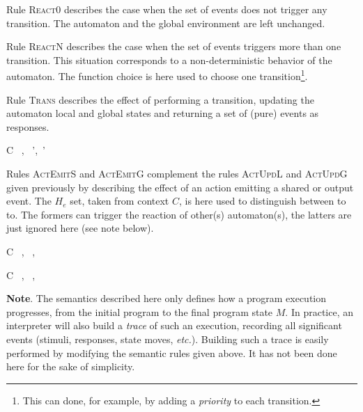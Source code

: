 Rule \textsc{React0} describes the case when the set of events does not trigger any transition. The
automaton and the global environment are left unchanged.

Rule \textsc{ReactN} describes the case when the set of events triggers more than one transition. This
situation corresponds to a non-deterministic behavior of the automaton. The
function \textsf{choice} is here used to choose one transition\footnote{This can done, for example,
  by adding a \emph{priority} to each transition.}. 

\medskip \step
Rule \textsc{Trans} describes the effect of performing a transition, updating the automaton local
and global states and returning a set of (pure) events as responses.

{C \vdash\ \mu,\ \env {} \mu',\ \env'}

\medskip\step Rules \textsc{ActEmitS} and \textsc{ActEmitG} complement the rules \textsc{ActUpdL} and \textsc{ActUpdG}
given previously by describing the effect of an action emitting a shared or output event. The
$H_e$ set, taken from context $C$, is here used to distinguish between to to. The formers can trigger the reaction of other(s)
automaton(s), the latters are just ignored here (see note below).

\begin{multicols}{2}
{C \vdash\ \vars,\ \env {} \vars,\ \env}

{C \vdash\ \vars,\ \env {} \vars,\ \env}
\end{multicols}

\bigskip
\textbf{Note}.
The semantics described here only defines how a program execution progresses, from the initial
program to the final program state $M$. In practice, an interpreter will also build a \emph{trace}
of such an execution, recording all significant events (stimuli, responses, state moves,
\emph{etc.}). Building such a trace is easily performed by modifying the semantic rules given above. It
has not been done here for the sake of simplicity.


